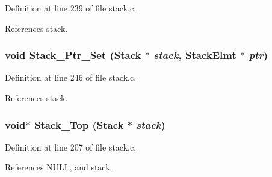 Definition at line 239 of file stack.c.

References stack.
\subsubsection{\setlength{\rightskip}{0pt plus 5cm}void Stack\_\-Ptr\_\-Set (\bf{Stack} $\ast$ {\em stack}, \bf{Stack\-Elmt} $\ast$ {\em ptr})}\label{stack_8h_e8b6e5381a362b06650904e94d526255}




Definition at line 246 of file stack.c.

References stack.
\subsubsection{\setlength{\rightskip}{0pt plus 5cm}void$\ast$ Stack\_\-Top (\bf{Stack} $\ast$ {\em stack})}\label{stack_8h_88b22023dbd5a58c3207a292739cc972}




Definition at line 207 of file stack.c.

References NULL, and stack.